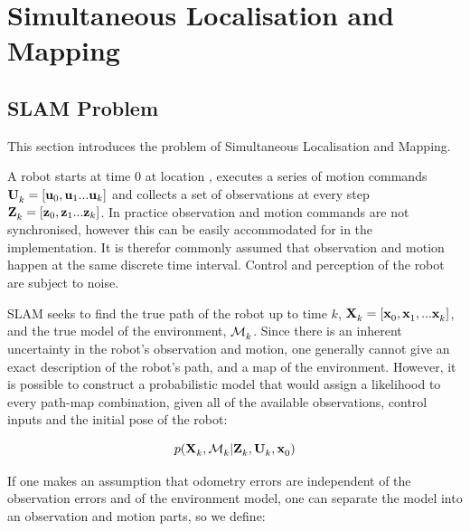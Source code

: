 \section{Simultaneous Localisation and Mapping}
\label{sec:SLAM}

\subsection{SLAM Problem}

This section introduces the problem of Simultaneous Localisation and
Mapping.

A robot starts at time 0 at location , executes a series of
motion commands ${\bf U}^{}_{k} = [{\bf u}_{0},{\bf u}_{1}...{\bf u}_{k}]$ and collects a
set of observations at every step
${\bf Z}^{}_{k}=[{\bf z}_{0},{\bf z}_{1}...{\bf z}_{k}]$. In practice observation and motion
commands are not synchronised, however this can be easily accommodated
for in the implementation. It is therefor commonly assumed that
observation and motion happen at the same discrete time interval.
Control and perception of the robot are subject to noise.


SLAM seeks to find the true path of the robot up to time $k$,
$\Xall{k}{}{} = [\x{0}{}{}, \x{1}{}{}, ... \x{k}{}{}]$, and the true
model of the environment, $\map{k}{}{}$. Since there is an inherent
uncertainty in the robot's observation and motion, one generally
cannot give an exact description of the robot's path, and a map of the
environment. However, it is possible to construct a probabilistic
model that would assign a likelihood to every path-map combination,
given all of the available observations, control inputs and the
initial pose of the robot:

\begin{equation}
 p(\Xall{k}{}{}, \map{k}{}{} | \Zall{k}{}, \Uall{k}{}, \x{0}{}{})
\label{eqn:map}
\end{equation}

If one makes an assumption that odometry errors are independent of the
observation errors and of the environment model, one can separate the
model into an observation and motion parts, so we define:

